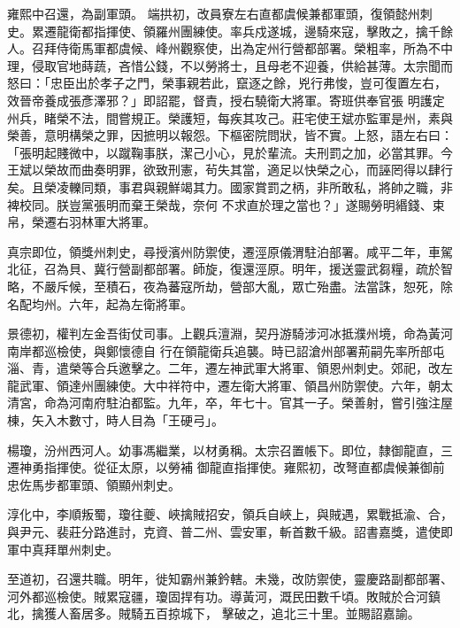 \begin{pinyinscope}
 雍熙中召還，為副軍頭。
 端拱初，改員寮左右直都虞候兼都軍頭，復領懿州刺史。累遷龍衛都指揮使、領羅州團練使。率兵戍遂城，邊騎來寇，擊敗之，擒千餘人。召拜侍衛馬軍都虞候、峰州觀察使，出為定州行營都部署。榮粗率，所為不中理，侵取官地蒔蔬，吝惜公錢，不以勞將士，且母老不迎養，供給甚薄。太宗聞而怒曰：「忠臣出於孝子之門，榮事親若此，竄逐之餘，兇行弗悛，豈可復置左右，效晉帝養成張彥澤邪？」即詔罷，督責，授右驍衛大將軍。寄班供奉官張
 明護定州兵，睹榮不法，間嘗規正。榮護短，每疾其攻己。莊宅使王斌亦監軍是州，素與榮善，意明構榮之罪，因摭明以報怨。下樞密院問狀，皆不實。上怒，語左右曰：「張明起賤微中，以蹴鞠事朕，潔己小心，見於輩流。夫刑罰之加，必當其罪。今王斌以榮故而曲奏明罪，欲致刑憲，茍失其當，適足以快榮之心，而誣罔得以肆行矣。且榮凌轢同類，事君與親鮮竭其力。國家賞罰之柄，非所敢私，將帥之職，非裨校同。朕豈黨張明而棄王榮哉，奈何
 不求直於理之當也？」遂賜勞明緡錢、束帛，榮遷右羽林軍大將軍。



 真宗即位，領獎州刺史，尋授濱州防禦使，遷涇原儀渭駐泊部署。咸平二年，車駕北征，召為貝、冀行營副都部署。師旋，復還涇原。明年，援送靈武芻糧，疏於智略，不嚴斥候，至積石，夜為蕃寇所劫，營部大亂，眾亡殆盡。法當誅，恕死，除名配均州。六年，起為左衛將軍。



 景德初，權判左金吾街仗司事。上觀兵澶淵，契丹游騎涉河冰抵濮州境，命為黃河南岸都巡檢使，與鄭懷德自
 行在領龍衛兵追襲。時已詔滄州部署荊嗣先率所部屯淄、青，遣榮等合兵邀擊之。二年，遷左神武軍大將軍、領恩州刺史。郊祀，改左龍武軍、領達州團練使。大中祥符中，遷左衛大將軍、領昌州防禦使。六年，朝太清宮，命為河南府駐泊都監。九年，卒，年七十。官其一子。榮善射，嘗引強注屋棟，矢入木數寸，時人目為「王硬弓」。



 楊瓊，汾州西河人。幼事馮繼業，以材勇稱。太宗召置帳下。即位，隸御龍直，三遷神勇指揮使。從征太原，以勞補
 御龍直指揮使。雍熙初，改弩直都虞候兼御前忠佐馬步都軍頭、領顯州刺史。



 淳化中，李順叛蜀，瓊往夔、峽擒賊招安，領兵自峽上，與賊遇，累戰抵渝、合，與尹元、裴莊分路進討，克資、普二州、雲安軍，斬首數千級。詔書嘉獎，遣使即軍中真拜單州刺史。



 至道初，召還共職。明年，徙知霸州兼鈐轄。未幾，改防禦使，靈慶路副都部署、河外都巡檢使。賊累寇疆，瓊固捍有功。導黃河，溉民田數千頃。敗賊於合河鎮北，擒獲人畜居多。賊騎五百掠城下，
 擊破之，追北三十里。並賜詔嘉諭。




\end{pinyinscope}
